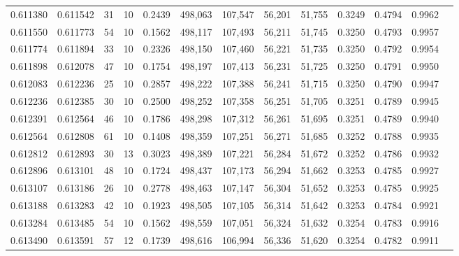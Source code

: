 \begin{tabular}{rrrrrrrrrrrrr}
0.611380 & 0.611542 &    31 &  10 &                                     0.2439 & 498,063 & 107,547 &  56,201 &  51,755 & 0.3249 & 0.4794 & 0.9962 \\
0.611550 & 0.611773 &    54 &  10 &                                     0.1562 & 498,117 & 107,493 &  56,211 &  51,745 & 0.3250 & 0.4793 & 0.9957 \\
0.611774 & 0.611894 &    33 &  10 &                                     0.2326 & 498,150 & 107,460 &  56,221 &  51,735 & 0.3250 & 0.4792 & 0.9954 \\
0.611898 & 0.612078 &    47 &  10 &                                     0.1754 & 498,197 & 107,413 &  56,231 &  51,725 & 0.3250 & 0.4791 & 0.9950 \\
0.612083 & 0.612236 &    25 &  10 &                                     0.2857 & 498,222 & 107,388 &  56,241 &  51,715 & 0.3250 & 0.4790 & 0.9947 \\
0.612236 & 0.612385 &    30 &  10 &                                     0.2500 & 498,252 & 107,358 &  56,251 &  51,705 & 0.3251 & 0.4789 & 0.9945 \\
0.612391 & 0.612564 &    46 &  10 &                                     0.1786 & 498,298 & 107,312 &  56,261 &  51,695 & 0.3251 & 0.4789 & 0.9940 \\
0.612564 & 0.612808 &    61 &  10 &                                     0.1408 & 498,359 & 107,251 &  56,271 &  51,685 & 0.3252 & 0.4788 & 0.9935 \\
0.612812 & 0.612893 &    30 &  13 &                                     0.3023 & 498,389 & 107,221 &  56,284 &  51,672 & 0.3252 & 0.4786 & 0.9932 \\
0.612896 & 0.613101 &    48 &  10 &                                     0.1724 & 498,437 & 107,173 &  56,294 &  51,662 & 0.3253 & 0.4785 & 0.9927 \\
0.613107 & 0.613186 &    26 &  10 &                                     0.2778 & 498,463 & 107,147 &  56,304 &  51,652 & 0.3253 & 0.4785 & 0.9925 \\
0.613188 & 0.613283 &    42 &  10 &                                     0.1923 & 498,505 & 107,105 &  56,314 &  51,642 & 0.3253 & 0.4784 & 0.9921 \\
0.613284 & 0.613485 &    54 &  10 &                                     0.1562 & 498,559 & 107,051 &  56,324 &  51,632 & 0.3254 & 0.4783 & 0.9916 \\
0.613490 & 0.613591 &    57 &  12 &                                     0.1739 & 498,616 & 106,994 &  56,336 &  51,620 & 0.3254 & 0.4782 & 0.9911 \\

\end{tabular}
